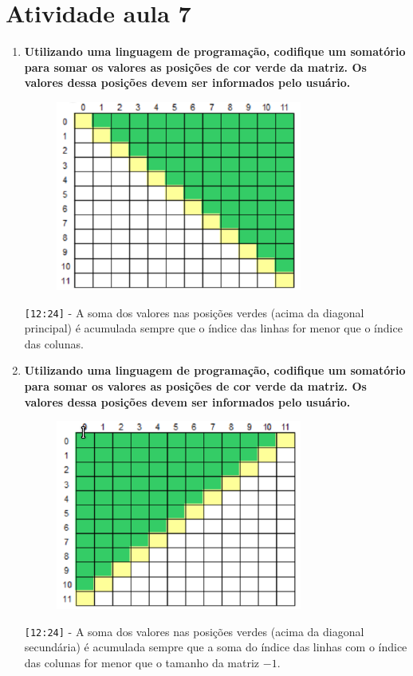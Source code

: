 \section*{Atividade aula 7}

\begin{enumerate}
	\item \textbf{Utilizando uma linguagem de programação, codifique um somatório para somar os valores as posições de cor verde da matriz. Os valores dessa posições devem ser informados pelo usuário.}
	\begin{figure}[H]
		\centering
		\includegraphics{7_1}
	\end{figure}
	
	\verb|[12:24]| - A soma dos valores nas posições verdes (acima da diagonal principal) é acumulada sempre que o índice das linhas for menor que o índice das colunas.

	\pagebreak
	\item \textbf{Utilizando uma linguagem de programação, codifique um somatório para somar os valores as posições de cor verde da matriz. Os valores dessa posições devem ser informados pelo usuário.}
	\begin{figure}[H]
		\centering
		\includegraphics{7_2}
	\end{figure}
	
	\verb|[12:24]| - A soma dos valores nas posições verdes (acima da diagonal secundária) é acumulada sempre que a soma do índice das linhas com o índice das colunas for menor que o tamanho da matriz $-1$.
	

\end{enumerate}
